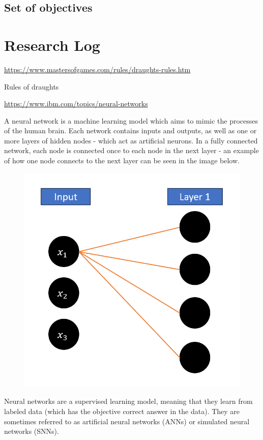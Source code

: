 \documentclass{article}
\begin{document}
    \subsection{Set of objectives}

    \section{Research Log}
    \url{https://www.mastersofgames.com/rules/draughts-rules.htm}

    Rules of draughts

    \noindent \url{https://www.ibm.com/topics/neural-networks}

    A neural network is a machine learning model which aims to mimic the processes of the human brain.
    Each network contains inputs and outputs, as well as one or more layers of hidden nodes - which act as artificial neurons.
    In a fully connected network, each node is connected once to each node in the next layer - an example of how one node connects
    to the next layer can be seen in the image below.

    \begin{figure}[h]
        \includegraphics[scale=0.3]{ConnectedNode.png} 
        \centering
    \end{figure}

    Neural networks are a supervised learning model, meaning that they learn from labeled data (which has the objective correct answer in the data).
    They are sometimes referred to as artificial neural networks (ANNs) or simulated neural networks (SNNs).\\
\end{document}
